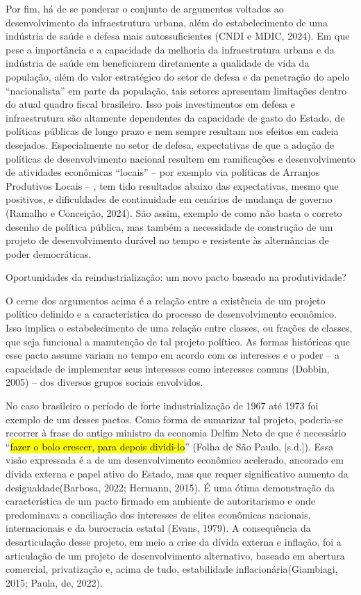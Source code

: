 Por fim, há de se ponderar o conjunto de argumentos voltados ao
desenvolvimento da infraestrutura urbana, além do estabelecimento de uma
indústria de saúde e defesa mais autossuficientes (CNDI e MDIC, 2024).
Em que pese a importância e a capacidade da melhoria da infraestrutura
urbana e da indústria de saúde em beneficiarem diretamente a qualidade
de vida da população, além do valor estratégico do setor de defesa e da
penetração do apelo ``nacionalista'' em parte da população, tais setores
apresentam limitações dentro do atual quadro fiscal brasileiro. Isso
pois investimentos em defesa e infraestrutura são altamente dependentes
da capacidade de gasto do Estado, de políticas públicas de longo prazo e
nem sempre resultam nos efeitos em cadeia desejados. Especialmente no
setor de defesa, expectativas de que a adoção de políticas de
desenvolvimento nacional resultem em ramificações e desenvolvimento de
atividades econômicas ``locais'' -- por exemplo via políticas de
Arranjos Produtivos Locais -- , tem tido resultados abaixo das
expectativas, mesmo que positivos, e dificuldades de continuidade em
cenários de mudança de governo (Ramalho e Conceição, 2024). São assim,
exemplo de como não basta o correto desenho de política pública, mas
também a necessidade de construção de um projeto de desenvolvimento
durável no tempo e resistente às alternâncias de poder democráticas.

Oportunidades da reindustrialização: um novo pacto baseado na
produtividade?

O cerne dos argumentos acima é a relação entre a existência de um
projeto político definido e a característica do processo de
desenvolvimento econômico. Isso implica o estabelecimento de uma relação
entre classes, ou frações de classes, que seja funcional a manutenção de
tal projeto político. As formas históricas que esse pacto assume variam
no tempo em acordo com os interesses e o poder -- a capacidade de
implementar seus interesses como interesses comuns (Dobbin, 2005) -- dos
diversos grupos sociais envolvidos.

No caso brasileiro o período de forte industrialização de 1967 até 1973
foi exemplo de um desses pactos. Como forma de sumarizar tal projeto,
poderia-se recorrer à frase do antigo ministro da economia Delfim Neto
de que é necessário ``\hl{fazer o bolo crescer, para depois dividi-lo}''
(Folha de São Paulo, {[}s.d.{]}). Essa visão expressada é a de um
desenvolvimento econômico acelerado, ancorado em dívida externa e papel
ativo do Estado, mas que requer significativo aumento da
desigualdade(Barbosa, 2022; Hermann, 2015). É uma ótima demonstração da
característica de um pacto firmado em ambiente de autoritarismo e onde
predominava a conciliação dos interesses de elites econômicas nacionais,
internacionais e da burocracia estatal (Evans, 1979). A consequência da
desarticulação desse projeto, em meio a crise da dívida externa e
inflação, foi a articulação de um projeto de desenvolvimento
alternativo, baseado em abertura comercial, privatização e, acima de
tudo, estabilidade inflacionária(Giambiagi, 2015; Paula, de, 2022).

